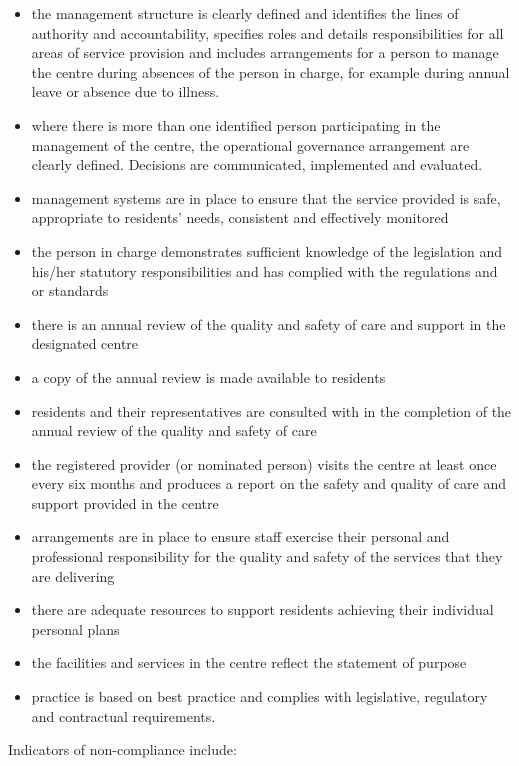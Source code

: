 \documentclass[a4paper,11pt,twoside]{article}
\begin{document}
\begin{itemize}
\item the management structure is clearly defined and identifies the lines of authority and accountability, specifies roles and details responsibilities for all areas of service provision and includes arrangements for a person to manage the centre during absences of the person in charge, for example during annual leave or absence due to illness.
\item where there is more than one identified person participating in the management of the centre, the operational governance arrangement are clearly defined. Decisions are communicated, implemented and evaluated.
\item management systems are in place to ensure that the service provided is safe, appropriate to residents’ needs, consistent and effectively monitored
\item the person in charge demonstrates sufficient knowledge of the legislation and his/her statutory responsibilities and has complied with the regulations and or standards
\item there is an annual review of the quality and safety of care and support in the designated centre
\item a copy of the annual review is made available to residents
\item residents and their representatives are consulted with in the completion of the annual review of the quality and safety of care
\item the registered provider (or nominated person) visits the centre at least once every six months and produces a report on the safety and quality of care and support provided in the centre
\item arrangements are in place to ensure staff exercise their personal and professional responsibility for the quality and safety of the services that they are delivering
\item there are adequate resources to support residents achieving their individual personal plans
\item the facilities and services in the centre reflect the statement of purpose
\item practice is based on best practice and complies with legislative, regulatory and contractual requirements.
\end{itemize}

Indicators of non-compliance include:
\end{document}
